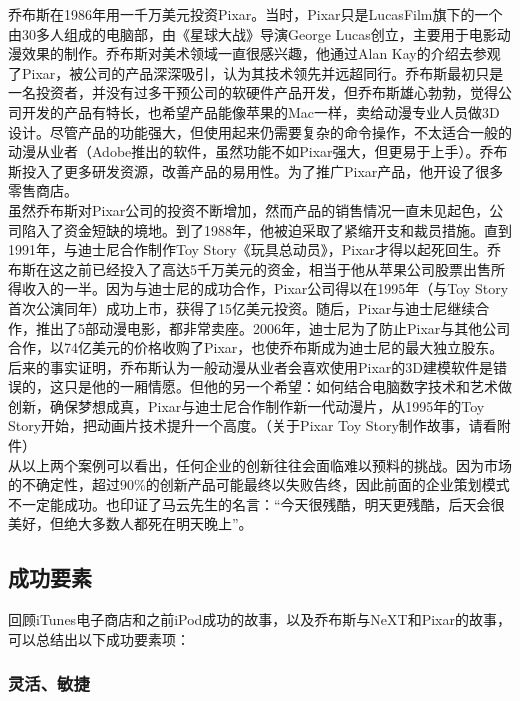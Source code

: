 乔布斯在1986年用一千万美元投资Pixar。当时，Pixar只是LucasFilm旗下的一个由30多人组成的电脑部，由《星球大战》导演George
Lucas创立，主要用于电影动漫效果的制作。乔布斯对美术领域一直很感兴趣，他通过Alan
Kay的介绍去参观了Pixar，被公司的产品深深吸引，认为其技术领先并远超同行。乔布斯最初只是一名投资者，并没有过多干预公司的软硬件产品开发，但乔布斯雄心勃勃，觉得公司开发的产品有特长，也希望产品能像苹果的Mac一样，卖给动漫专业人员做3D设计。尽管产品的功能强大，但使用起来仍需要复杂的命令操作，不太适合一般的动漫从业者（Adobe推出的软件，虽然功能不如Pixar强大，但更易于上手）。乔布斯投入了更多研发资源，改善产品的易用性。为了推广Pixar产品，他开设了很多零售商店。\\
虽然乔布斯对Pixar公司的投资不断增加，然而产品的销售情况一直未见起色，公司陷入了资金短缺的境地。到了1988年，他被迫采取了紧缩开支和裁员措施。直到1991年，与迪士尼合作制作Toy
Story《玩具总动员》，Pixar才得以起死回生。乔布斯在这之前已经投入了高达5千万美元的资金，相当于他从苹果公司股票出售所得收入的一半。因为与迪士尼的成功合作，Pixar公司得以在1995年（与Toy
Story首次公演同年）成功上市，获得了15亿美元投资。随后，Pixar与迪士尼继续合作，推出了5部动漫电影，都非常卖座。2006年，迪士尼为了防止Pixar与其他公司合作，以74亿美元的价格收购了Pixar，也使乔布斯成为迪士尼的最大独立股东。\\
后来的事实证明，乔布斯认为一般动漫从业者会喜欢使用Pixar的3D建模软件是错误的，这只是他的一厢情愿。但他的另一个希望：如何结合电脑数字技术和艺术做创新，确保梦想成真，Pixar与迪士尼合作制作新一代动漫片，从1995年的Toy
Story开始，把动画片技术提升一个高度。（关于Pixar Toy
Story制作故事，请看附件）\\
从以上两个案例可以看出，任何企业的创新往往会面临难以预料的挑战。因为市场的不确定性，超过90\%的创新产品可能最终以失败告终，因此前面的企业策划模式不一定能成功。也印证了马云先生的名言：``今天很残酷，明天更残酷，后天会很美好，但绝大多数人都死在明天晚上''。

\hypertarget{ux6210ux529fux8981ux7d20}{%
\subsection{成功要素}\label{ux6210ux529fux8981ux7d20}}

回顾iTunes电子商店和之前iPod成功的故事，以及乔布斯与NeXT和Pixar的故事，可以总结出以下成功要素项：

\hypertarget{ux7075ux6d3bux654fux6377}{%
\subsubsection{灵活、敏捷}\label{ux7075ux6d3bux654fux6377}}

